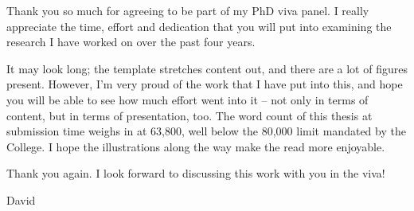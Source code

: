 
\begin{preamble}

Thank you so much for agreeing to be part of my PhD viva panel. I really appreciate the time, effort and dedication that you will put into examining the research I have worked on over the past four years.

It may look long; the template stretches content out, and there are a lot of figures present. However, I'm very proud of the work that I have put into this, and hope you will be able to see how much effort went into it -- not only in terms of content, but in terms of presentation, too. The word count of this thesis at submission time weighs in at 63,800, well below the 80,000 limit mandated by the College. I hope the illustrations along the way make the read more enjoyable.

Thank you again. I look forward to discussing this work with you in the viva!

David

\end{preamble}